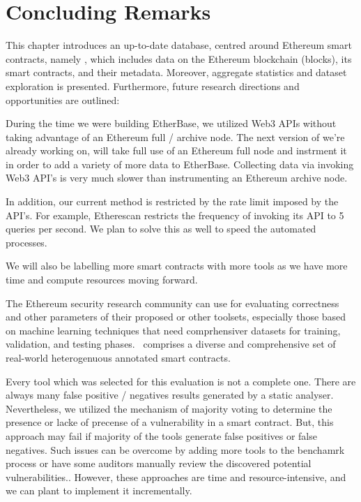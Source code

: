\section{Concluding Remarks}
	This chapter introduces an up-to-date database, centred around Ethereum smart contracts, namely \etherbase, which includes data on the Ethereum blockchain (blocks), its smart contracts, and their metadata.
	Moreover, aggregate statistics and dataset exploration is presented.
	Furthermore, future research directions and opportunities are outlined:

	During the time we were building EtherBase, we utilized Web3 APIs without taking advantage of an Ethereum full / archive node.
	The next version of \etherbase we're already working on, will take full use of an Ethereum full node and instrment it in order to add a variety of more data to EtherBase.
	Collecting data via invoking Web3 API's is very much slower than instrumenting an Ethereum archive node.
	
	In addition, our current method is restricted by the rate limit imposed by the API's.
	For example, Etherescan restricts the frequency of invoking its API to 5 queries per second. We plan to solve this as well to speed the automated processes.

	We will also be labelling more smart contracts with more tools as we have more time and compute resources moving forward.

	The Ethereum security research community can use \etherbase for evaluating correctness and other parameters of their proposed or other toolsets, especially those based on machine learning techniques that need comprhensiver datasets for training, validation, and testing phases.
	\etherbase~comprises a diverse and comprehensive set of real-world heterogenuous annotated smart contracts.
	
	Every tool which was selected for this evaluation is not a complete one.
	There are always many false positive / negatives results generated by a static analyser.
	Nevertheless, we utilized the mechanism of majority voting to determine the presence or lacke of precense of a vulnerability in a smart contract.
	But, this approach may fail if majority of the tools generate false positives or false negatives.
	Such issues can be overcome by adding more tools to the benchamrk process or have some auditors manually review the discovered potential vulnerabilities..
	However, these approaches are time and resource-intensive, and we can plant to implement it incrementally.